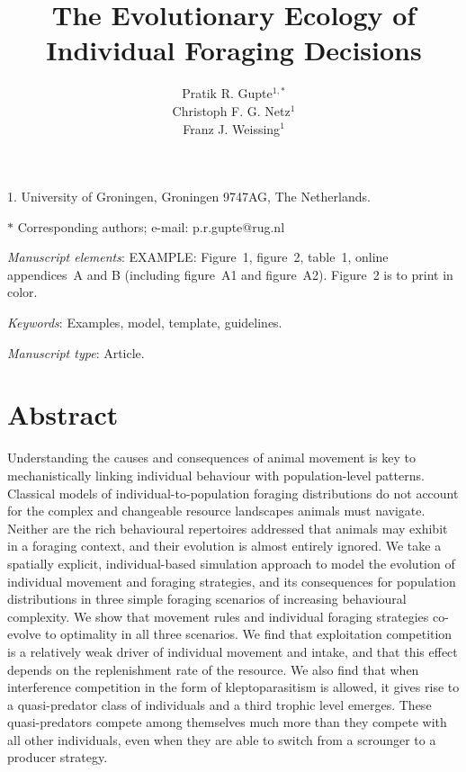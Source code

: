 \documentclass[11pt]{article}
\title{The Evolutionary Ecology of Individual Foraging Decisions}
\author{Pratik R. Gupte$^{1,\ast}$ \\ 
        Christoph F. G. Netz$^{1}$ \\ 
        Franz J. Weissing$^{1}$}
\date{}
\begin{document}
\maketitle

\noindent{} 1. University of Groningen, Groningen 9747AG, The Netherlands.

\noindent{} $\ast$ Corresponding authors; e-mail: p.r.gupte@rug.nl

\bigskip

\textit{Manuscript elements}: EXAMPLE: Figure~1, figure~2, table~1, online appendices~A and B (including figure~A1 and figure~A2). Figure~2 is to print in color.

\bigskip

\textit{Keywords}: Examples, model, template, guidelines.

\bigskip

\textit{Manuscript type}: Article. %

\bigskip


\linenumbers{}
\modulolinenumbers[1]

\newpage{}

\section*{Abstract}

Understanding the causes and consequences of animal movement is key to mechanistically linking individual behaviour with population-level patterns.
Classical models of individual-to-population foraging distributions do not account for the complex and changeable resource landscapes animals must navigate.
Neither are the rich behavioural repertoires addressed that animals may exhibit in a foraging context, and their evolution is almost entirely ignored.
We take a spatially explicit, individual-based simulation approach to model the evolution of individual movement and foraging strategies, and its consequences for population distributions in three simple foraging scenarios of increasing behavioural complexity.
We show that movement rules and individual foraging strategies co-evolve to optimality in all three scenarios.
We find that exploitation competition is a relatively weak driver of individual movement and intake, and that this effect depends on the replenishment rate of the resource.
We also find that when interference competition in the form of kleptoparasitism is allowed, it gives rise to a quasi-predator class of individuals and a third trophic level emerges.
These quasi-predators compete among themselves much more than they compete with all other individuals, even when they are able to switch from a scrounger to a producer strategy.
\end{document}
